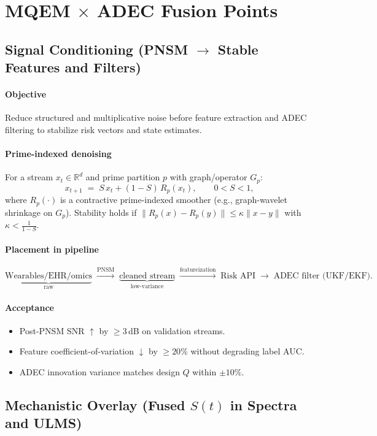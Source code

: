 \documentclass[11pt]{article}
\theoremstyle{plain}
\begin{document}
\section{MQEM $\times$ ADEC Fusion Points}

\subsection{Signal Conditioning (PNSM $\rightarrow$ Stable Features and Filters)}
\paragraph{Objective}
Reduce structured and multiplicative noise before feature extraction and ADEC filtering to stabilize risk vectors and state estimates.

\paragraph{Prime-indexed denoising}
For a stream $x_t\!\in\!\mathbb{R}^d$ and prime partition $p$ with graph/operator $G_p$:
\[
x_{t+1}\;=\;S\,x_t + (1{-}S)\,R_p(x_t),\qquad 0<S<1,
\]
where $R_p(\cdot)$ is a contractive prime-indexed smoother (e.g., graph-wavelet shrinkage on $G_p$).
Stability holds if $\|R_p(x)-R_p(y)\|\le\kappa\|x-y\|$ with $\kappa<\frac{1}{1-S}$.

\paragraph{Placement in pipeline}
\[
\underbrace{\text{Wearables/EHR/omics}}_{\text{raw}} \;\xrightarrow{\text{PNSM}}\; 
\underbrace{\text{cleaned stream}}_{\text{low-variance}} \;\xrightarrow{\text{featureization}}\; 
\text{Risk API} \;\xrightarrow{}\; \text{ADEC filter (UKF/EKF)}.
\]

\paragraph{Acceptance}
\begin{itemize}
  \item Post-PNSM SNR $\uparrow$ by $\ge 3$\,dB on validation streams.
  \item Feature coefficient-of-variation $\downarrow$ by $\ge 20\%$ without degrading label AUC.
  \item ADEC innovation variance matches design $Q$ within $\pm 10\%$.
\end{itemize}

\subsection{Mechanistic Overlay (Fused $S(t)$ in Spectra and ULMS)}
\end{document}
